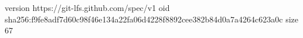 version https://git-lfs.github.com/spec/v1
oid sha256:f9fe8adf7d60c98f46e134a22fa06d4228f8892cee382b84d0a7a4264c623a0c
size 67
